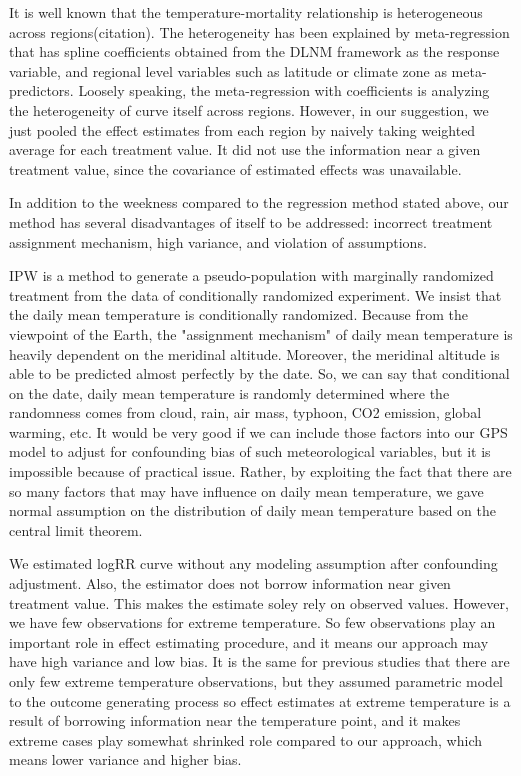 \documentclass[12pt]{article}
\begin{document}
It is well known that the temperature-mortality relationship is heterogeneous across regions(citation).
The heterogeneity has been explained by meta-regression
that has spline coefficients obtained from the DLNM framework as the response variable, 
and regional level variables such as latitude or climate zone as meta-predictors.
Loosely speaking, the meta-regression with coefficients
is analyzing the heterogeneity of curve itself across regions.
However, in our suggestion, we just pooled the effect estimates from each region 
by naively taking weighted average for each treatment value.
It did not use the information near a given treatment value,
since the covariance of estimated effects was unavailable.

In addition to the weekness compared to the regression method stated above,
our method has several disadvantages of itself to be addressed:
incorrect treatment assignment mechanism, high variance, and violation of assumptions.

IPW is a method to generate a pseudo-population with marginally randomized treatment
from the data of conditionally randomized experiment.
We insist that the daily mean temperature is conditionally randomized.
Because from the viewpoint of the Earth, 
the "assignment mechanism" of daily mean temperature is heavily dependent on the meridinal altitude.
Moreover, the meridinal altitude is able to be predicted almost perfectly by the date.
So, we can say that conditional on the date, daily mean temperature is randomly determined
where the randomness comes from cloud, rain, air mass, typhoon, CO2 emission, global warming, etc.
It would be very good if we can include those factors into our GPS model 
to adjust for confounding bias of such meteorological variables,
but it is impossible because of practical issue.
Rather, by exploiting the fact that 
there are so many factors that may have influence on daily mean temperature,
we gave normal assumption on the distribution of daily mean temperature 
based on the central limit theorem.

We estimated logRR curve without any modeling assumption after confounding adjustment.
Also, the estimator does not borrow information near given treatment value.
This makes the estimate soley rely on observed values.
However, we have few observations for extreme temperature.
So few observations play an important role in effect estimating procedure,
and it means our approach may have high variance and low bias.
It is the same for previous studies that there are only few extreme temperature observations,
but they assumed parametric model to the outcome generating process
so effect estimates at extreme temperature is a result of borrowing information near the temperature point,
and it makes extreme cases play somewhat shrinked role compared to our approach,
which means lower variance and higher bias.
\end{document}
